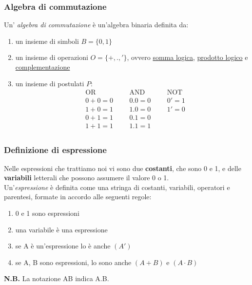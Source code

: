 \documentclass{article}
\begin{document}
\subsubsection{Algebra di commutazione}
Un' \textit{algebra di commutazione} è un'algebra binaria definita da:
\begin{enumerate}
    \item un insieme di simboli $B = \{ 0,1 \}$
    \item un insieme di operazioni $O = \{ +,.,'\}$, ovvero \underline{somma logica}, \underline{prodotto logico} e \underline{complementazione}
    \item un insieme di postulati $P$:
    \begin{align*}
        &\text{OR} && &\text{AND} && &\text{NOT}\\
        &0+0 = 0 && &0.0=0 && &0'=1\\
        &1+0=1 && &1.0=0 && &1'=0\\
        &0+1=1 && &0.1=0\\
        &1+1=1 && &1.1=1\\
    \end{align*}
\end{enumerate}
\subsubsection{Definizione di espressione}
Nelle espressioni che trattiamo noi vi sono due \textbf{costanti}, che sono 0 e 1, e delle \textbf{variabili} letterali che possono assumere il valore 0 o 1.\\
Un'\textit{espressione} è definita come una stringa di costanti, variabili, operatori e parentesi, formate in accordo alle seguenti regole:
\begin{enumerate}
    \item 0 e 1 sono espressioni
    \item una variabile è una espressione
    \item se A è un'espressione lo è anche $(A')$
    \item se A, B sono espressioni, lo sono anche $(A+B)$ e $(A \cdot B)$
\end{enumerate}
\textbf{N.B.} La notazione AB indica A.B.
\end{document}
